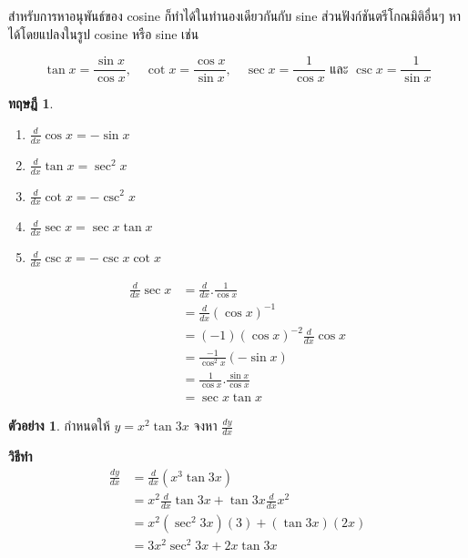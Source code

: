 \documentclass[
]{book}
\newtheorem{theorem}{ทฤษฎี}[chapter]
\theoremstyle{definition}
\theoremstyle{definition}
\newtheorem{example}{ตัวอย่าง}[chapter]
\theoremstyle{definition}
\theoremstyle{definition}
\theoremstyle{remark}
\begin{document}
\hfill\break
สำหรับการหาอนุพันธ์ของ cosine ก็ทำได้ในทำนองเดียวกันกับ sine ส่วนฟังก์ชันตรีโกณมิติอื่นๆ
หาได้โดยแปลงในรูป cosine หรือ sine เช่น

\[\tan x= \frac{\sin x}{\cos x}, \quad \cot x=\frac{\cos x}{\sin
x}, \quad \sec x=\frac{1}{\cos x} \text{ และ } \displaystyle \csc x=\frac{1}{\sin x}\]

\begin{theorem}
\leavevmode

\begin{enumerate}
\def\labelenumi{\arabic{enumi}.}
\item
  \(\displaystyle\frac{d}{dx}\cos x=-\sin x\)
\item
  \(\displaystyle\frac{d}{dx}\tan x=\sec^{2} x\)
\item
  \(\displaystyle\frac{d}{dx}\cot x=-\csc^{2} x\)
\item
  \(\displaystyle\frac{d}{dx}\sec x=\sec x \tan x\)
\item
  \(\displaystyle\frac{d}{dx}\csc x=-\csc x\cot x\)
\end{enumerate}

\end{theorem}

\begin{equation}   \begin{aligned}
\displaystyle \frac{d}{dx}\sec x&=\frac{d}{dx}.\frac{1}{\cos x}\\
&=\frac{d}{dx}(\cos x)^{-1}\\
&=(-1)(\cos x)^{-2}\displaystyle \frac{d}{dx}\cos x\\
&=\displaystyle \frac{-1}{\cos^{2} x}(-\sin x)\\
&=\displaystyle \frac{1}{\cos x}.\frac{\sin x}{\cos x}\\
&=\sec x\tan x
  \end{aligned} \end{equation}

\begin{example}
กำหนดให้ \(y=x^{2}\tan 3x\) จงหา \(\displaystyle
\frac{dy}{dx}\)
\end{example}

\textbf{วิธีทำ} \begin{equation}   \begin{aligned}
\displaystyle \frac{dy}{dx}&=\frac{d}{dx}(x^{3}\tan 3x)\\
&=x^{2}\displaystyle \frac{d}{dx}\tan 3x+\tan 3x\frac{d}{dx}x^{2}\\
&=x^{2}(\sec^{2}3x)(3)+(\tan 3x)(2x)\\
&=3x^{2}\sec^{2}3x+2x\tan 3x
  \end{aligned} \end{equation}
\end{document}
